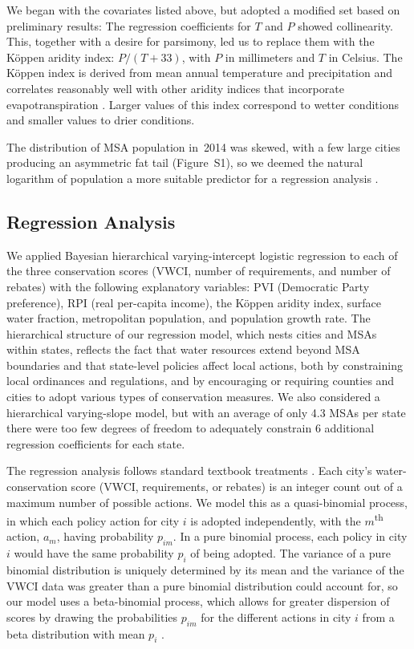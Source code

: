 \documentclass[draft,linenumbers]{agujournal}\usepackage{knitr}
\begin{document}
We began with the covariates listed above, but adopted a modified set based on
preliminary results: The regression coefficients for $T$ and $P$ showed
collinearity.
This, together with a desire for parsimony, led us to replace them with the
K\"oppen aridity index: $P / (T + 33)$, with $P$ in millimeters and $T$ in
Celsius.
The K\"oppen index is
derived from mean annual temperature and precipitation
and correlates reasonably well with other aridity indices
that incorporate evapotranspiration
\citep{quan:aridity:2013}.
Larger values of this index correspond to wetter conditions
and smaller values to drier conditions.

The distribution of MSA population in~2014 was skewed, with
a few large cities producing an asymmetric fat tail (Figure~S1),
so we deemed the natural logarithm of population
a more suitable predictor
for a regression analysis \citep[pp.~59--61]{gelman:arm:2007}.

\subsection{Regression Analysis}
We applied Bayesian hierarchical varying-intercept
logistic regression to each of the
three conservation scores (VWCI, number of requirements, and number of rebates)
with the following explanatory variables:
PVI (Democratic Party preference), RPI (real per-capita income),
the K\"oppen aridity index, surface water fraction,
metropolitan population, and population growth rate.
The hierarchical structure of our regression model, which nests cities and MSAs
within states, reflects the fact that water resources extend beyond MSA
boundaries and that state-level policies affect local actions, both by
constraining local ordinances and regulations, and by encouraging or requiring
counties and cities to adopt various types of conservation measures.
We also considered a hierarchical varying-slope model, but with an average
of only 4.3 MSAs per state there were too few degrees of freedom to adequately
constrain 6 additional regression coefficients for each state.

The regression analysis follows standard textbook treatments
\citep{gelman:arm:2007,gelman:bda:2014}.
Each city's water-conservation score (VWCI, requirements, or rebates) is
an integer count out of a maximum number of possible actions.
We model this as a quasi-binomial process, in which each policy action
for city $i$ is adopted independently, with
the $m$\textsuperscript{th} action, $a_m$, having probability
$p_{im}$.
In a pure binomial process, each policy in city $i$ would have the same
probability $p_i$ of being adopted.
The variance of a pure binomial distribution is uniquely determined
by its mean and the variance of the VWCI data was
greater than a pure binomial
distribution could account for,
so our model uses a beta-binomial process, which allows for greater dispersion
of scores by drawing the probabilities $p_{im}$
for the different actions in city $i$ from a beta distribution with mean $p_i$
\citep[pp.~437--38]{gelman:bda:2014}.
\end{document}
